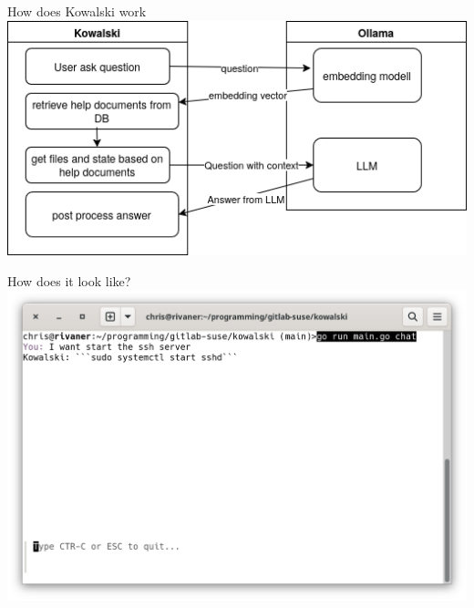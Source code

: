 \documentclass[aspectratio=169]{beamer}
\begin{document}
\begin{frame}{How does Kowalski work}
\includegraphics[width=\linewidth]{Flow.drawio}
\end{frame}

\begin{frame}{How does it look like?}
\includegraphics[width=.8\linewidth]{Startsshd.png}
\end{frame}
\end{document}
